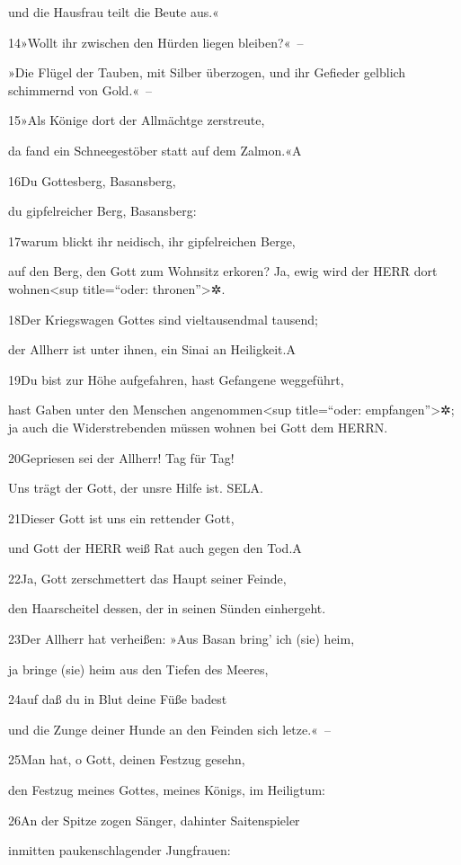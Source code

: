 und die Hausfrau teilt die Beute aus.«

14»Wollt ihr zwischen den Hürden liegen bleiben?«~--

»Die Flügel der Tauben, mit Silber überzogen, und ihr Gefieder gelblich
schimmernd von Gold.«~--

15»Als Könige dort der Allmächtge zerstreute,

da fand ein Schneegestöber statt auf dem Zalmon.«{A}

16Du Gottesberg, Basansberg,

du gipfelreicher Berg, Basansberg:

17warum blickt ihr neidisch, ihr gipfelreichen Berge,

auf den Berg, den Gott zum Wohnsitz erkoren? Ja, ewig wird der HERR dort
wohnen\textless sup title=``oder: thronen''\textgreater✲.

18Der Kriegswagen Gottes sind vieltausendmal tausend;

der Allherr ist unter ihnen, ein Sinai an Heiligkeit.{A}

19Du bist zur Höhe aufgefahren, hast Gefangene weggeführt,

hast Gaben unter den Menschen angenommen\textless sup title=``oder:
empfangen''\textgreater✲; ja auch die Widerstrebenden müssen wohnen bei
Gott dem HERRN.

20Gepriesen sei der Allherr! Tag für Tag!

Uns trägt der Gott, der unsre Hilfe ist. SELA.

21Dieser Gott ist uns ein rettender Gott,

und Gott der HERR weiß Rat auch gegen den Tod.{A}

22Ja, Gott zerschmettert das Haupt seiner Feinde,

den Haarscheitel dessen, der in seinen Sünden einhergeht.

23Der Allherr hat verheißen: »Aus Basan bring' ich (sie) heim,

ja bringe (sie) heim aus den Tiefen des Meeres,

24auf daß du in Blut deine Füße badest

und die Zunge deiner Hunde an den Feinden sich letze.«~--

25Man hat, o Gott, deinen Festzug gesehn,

den Festzug meines Gottes, meines Königs, im Heiligtum:

26An der Spitze zogen Sänger, dahinter Saitenspieler

inmitten paukenschlagender Jungfrauen:


